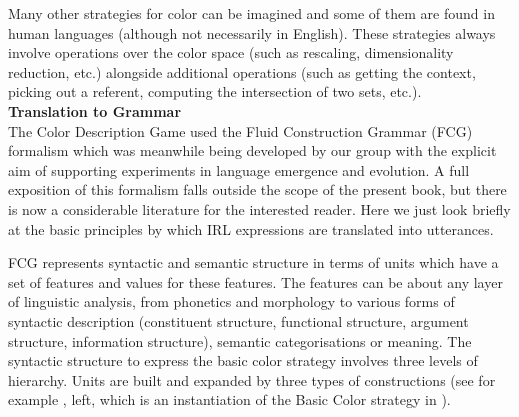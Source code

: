 Many other strategies for color can be imagined and some of them are found in human languages (although not necessarily in English). 
These strategies always involve operations over the color space (such as rescaling, dimensionality reduction, etc.) alongside 
additional operations (such as getting the context, picking out a referent, computing the intersection of two sets, etc.). \\

{\bf Translation to Grammar} \\

The Color Description Game used the Fluid Construction Grammar (FCG) formalism which was meanwhile being developed by our 
group with the explicit aim of supporting experiments in language emergence and evolution. A full exposition of this 
formalism falls outside the scope of the present book, but there is now a considerable literature for the interested 
reader.\cite{Steels:2011} Here we just look briefly at the basic principles by which IRL 
expressions are translated into utterances. 

FCG represents syntactic and semantic structure in terms of units which have a set of features and values for these 
features. The features can be about any layer of linguistic analysis, from phonetics and morphology to various 
forms of syntactic description (constituent structure, functional structure, argument structure, information structure), 
semantic categorisations or meaning. 
The syntactic structure to express the basic color strategy involves three levels of hierarchy. Units are built 
and expanded by three types of constructions (see for example , left, which is an instantiation of 
the Basic Color strategy in ). 

